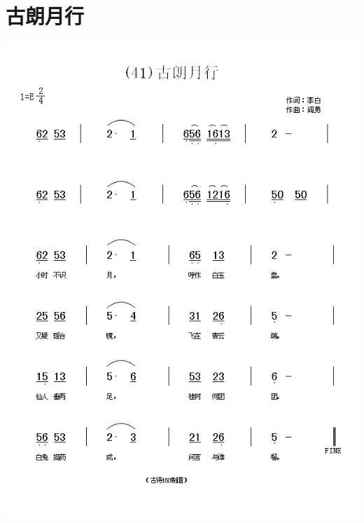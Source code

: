 \documentclass[cn,pad,twocol]{elegantbook}
\begin{document}
\section{古朗月行}
    \includegraphics[width=\textwidth]{dongxiao/20200808-古朗月行-李白.jpg}    
\end{document}
